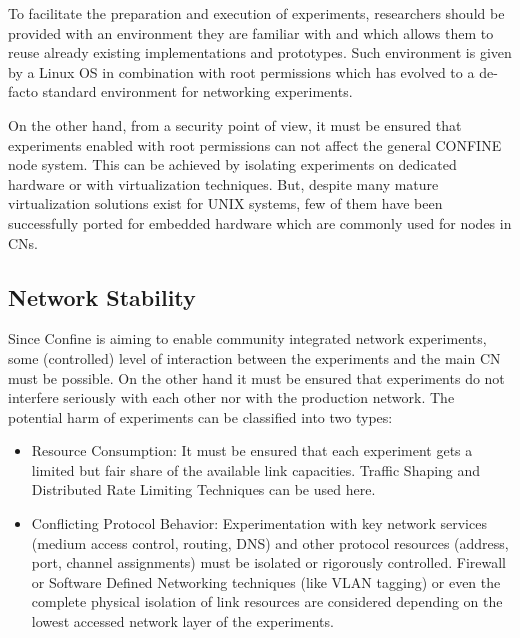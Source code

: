 \documentclass[conference]{IEEEtran}
\begin{document}
To facilitate the preparation and execution of experiments,
researchers should be provided with an environment they are familiar
with and which allows them to reuse already existing implementations
and prototypes.  Such environment is given by a Linux OS in
combination with root permissions which has evolved to a de-facto
standard environment for networking experiments.

On the other hand, from a security point of view, it must be ensured
that experiments enabled with root permissions can not affect the
general CONFINE node system. This can be achieved by isolating
experiments on dedicated hardware or with virtualization techniques.
But, despite many mature virtualization solutions exist for UNIX
systems, few of them have been successfully ported for embedded
hardware which are commonly used for nodes in CNs.

\subsection{Network Stability}
Since Confine is aiming to enable community integrated network
experiments, some (controlled) level of interaction between the
experiments and the main CN must be possible. On the other hand it
must be ensured that experiments do not interfere seriously with each
other nor with the production network.  The potential harm of
experiments can be classified into two types:

\begin{itemize}

\item Resource Consumption: It must be ensured that each experiment
  gets a limited but fair share of the available link capacities.
  Traffic Shaping and Distributed Rate Limiting Techniques can be used
  here.

\item Conflicting Protocol Behavior: Experimentation with key network
  services (medium access control, routing, DNS) and other protocol
  resources (address, port, channel assignments) must be isolated or
  rigorously controlled.  Firewall or Software Defined Networking
  techniques (like VLAN tagging) or even the complete physical
  isolation of link resources are considered depending on the lowest
  accessed network layer of the experiments.

\end{itemize}
\end{document}

